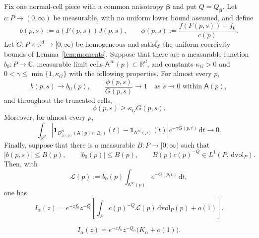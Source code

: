 \documentclass[10pt,a4paper]{amsart}
\newcommand{\Afib}{\mathsf{A}}
\newcommand{\C}{\mathbb{C}}
\newcommand{\R}{\mathbb{R}}
\newcommand{\cL}{\mathcal{L}}
\newcommand{\dd}{\,\mathrm{d}}
\newcommand{\dvol}{\,\mathrm{dvol}}
\newcommand{\eps}{\varepsilon}
\newcommand{\ind}{\mathbf{1}}
\begin{document}
\begin{theorem}
\label{thm:integrated-pointwise-cells}
Fix one normal-cell piece with a common anisotropy $\bm\beta$ and put
$Q=Q_{\bm\beta}$.  Let $c:P\to(0,\infty)$ be measurable, with no uniform lower
bound assumed, and define
\[
 b(p,s):=a(F(p,s))J(p,s),\qquad
 \phi(p,s):=\frac{f(F(p,s))-f_0}{c(p)}.
\]
Let $G:P\times\R^d\to[0,\infty)$ be homogeneous and satisfy the uniform
coercivity bounds of Lemma~\ref{lem:moments}.  Suppose that there are a
measurable function $b_0:P\to\C$, measurable limit cells
$\Afib^\infty(p)\subset\R^d$, and constants $\kappa_G>0$ and
$0<\gamma\le\min\{1,\kappa_G\}$ with the following properties.
For almost every $p$,
\begin{equation}\label{eq:pointwise-cell-local-limits}
 b(p,s)\longrightarrow b_0(p),\qquad
 \frac{\phi(p,s)}{G(p,s)}\longrightarrow1
 \quad\text{as }s\to0\text{ within }\Afib(p),
\end{equation}
and throughout the truncated cells,
\begin{equation}\label{eq:pointwise-cell-lower}
 \phi(p,s)\ge\kappa_G G(p,s).
\end{equation}
Moreover, for almost every $p$,
\begin{equation}\label{eq:pointwise-weighted-cell-limit}
 \int_{\R^d}
 \left|\ind_{D_{zc(p)}^{\bm\beta}(\Afib(p)\cap B_\eps)}(t)
       -\ind_{\Afib^\infty(p)}(t)\right|
 e^{-\gamma G(p,t)}\dd t\longrightarrow0.
\end{equation}
Finally, suppose that there is a measurable $B:P\to[0,\infty)$ such that
\begin{equation}\label{eq:pointwise-cell-majorant}
 |b(p,s)|\le B(p),\qquad |b_0(p)|\le B(p),\qquad
 B(p)c(p)^{-Q}\in L^1(P,\dvol_P).
\end{equation}
Then, with
\begin{equation}\label{eq:pointwise-cell-profile}
 \cL(p):=b_0(p)\int_{\Afib^\infty(p)}e^{-G(p,t)}\dd t,
\end{equation}
one has
\begin{equation}\label{eq:pointwise-cell-result}
 I_\alpha(z)=e^{-zf_0}z^{-Q}
 \left[\int_P c(p)^{-Q}\cL(p)\dvol_P(p)+o(1)\right].
\end{equation}
\end{theorem}

\begin{equation}\label{eq:piece-integrated-leading}
 I_\alpha(z)=e^{-zf_0}z^{-Q_\alpha}\bigl(K_\alpha+o(1)\bigr).
\end{equation}
\end{document}
